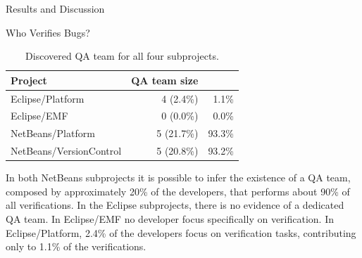 \begin{section}{Results and Discussion}
\begin{subsection}{Who Verifies Bugs?}
	\begin{table}
		\begin{center}
		
		\caption{Discovered QA team for all four subprojects.}
		\begin{tabular}{l|r|r}
			\textbf{\centering Project} & 
			\textbf{\centering QA team size} & 
			\MyHead{2.5cm}{\textbf{\% of verifications by QA team}} \\
			\hline
			Eclipse/Platform        & 4 (2.4\%)  &  1.1\% \\
			Eclipse/EMF             & 0 (0.0\%)  &  0.0\% \\
			NetBeans/Platform       & 5 (21.7\%) & 93.3\% \\
			NetBeans/VersionControl & 5 (20.8\%) & 93.2\% \\
		\end{tabular}
		\end{center}

		\label{tab:qa}
	\end{table}
	
	
% 
% 
% 
	
	In both NetBeans subprojects it is possible to infer the existence of a QA team, composed by approximately 20\% of the developers, that performs about 90\% of all verifications. In the Eclipse subprojects, there is no evidence of a dedicated QA team. In Eclipse/EMF no developer focus specifically on verification. In Eclipse/Platform, 2.4\% of the developers focus on verification tasks, contributing only to 1.1\% of the verifications.
	
	
\end{subsection}

\end{section}

